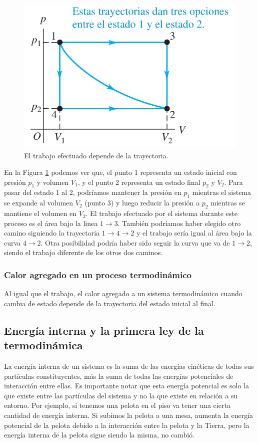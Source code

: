 \documentclass[12pt]{article}
\begin{document}
  \begin{figure}[H]
    \centering
    \includegraphics[width=0.5\linewidth]{imagenes/trabajo-trayectoria.png}
    \caption{El trabajo efectuado depende de la trayectoria.}
    \label{fig:trabajo-trayectoria}
  \end{figure}
  
  En la Figura \ref{fig:trabajo-trayectoria} podemos ver que, el punto 1 representa un estado inicial con presión $ p_{1} $ y volumen $ V_{1} $, y el punto 2 representa un estado final $ p_{2} $ y $ V_{2} $. Para pasar del estado 1 al 2, podríamos mantener la presión en $ p_{1} $ mientras el sistema se expande al volumen $ V_{2} $ (punto 3) y luego reducir la presión a $ p_{2} $ mientras se mantiene el volumen en $ V_{2} $. El trabajo efectuado por el sistema durante este proceso es el área bajo la linea $ 1 \to 3 $. También podríamos haber elegido otro camino siguiendo la trayectoria $ 1 \to 4 \to 2 $ y el trabajo sería igual al área bajo la curva $ 4 \to 2 $. Otra posibilidad podría haber sido seguir la curva que va de $ 1 \to 2 $, siendo el trabajo diferente de los otros dos caminos.

  \subsubsection{Calor agregado en un proceso termodinámico}
  Al igual que el trabajo, el calor agregado a un sistema termodinámico cuando cambia de estado depende de la trayectoria del estado inicial al final.

  \subsection{Energía interna y la primera ley de la termodinámica}
  La energía interna de un sistema es la suma de las energías cinéticas de todas sus partículas constituyentes, más la suma de todas las energías potenciales de interacción entre ellas. Es importante notar que esta energía potencial es solo la que existe entre las partículas del sistema y no la que existe en relación a su entorno. Por ejemplo, si tenemos una pelota en el piso va tener una cierta cantidad de energía interna. Si subimos la pelota a una mesa, aumenta la energía potencial de la pelota debido a la interacción entre la pelota y la Tierra, pero la energía interna de la pelota sigue siendo la misma, no cambió.
\end{document}
